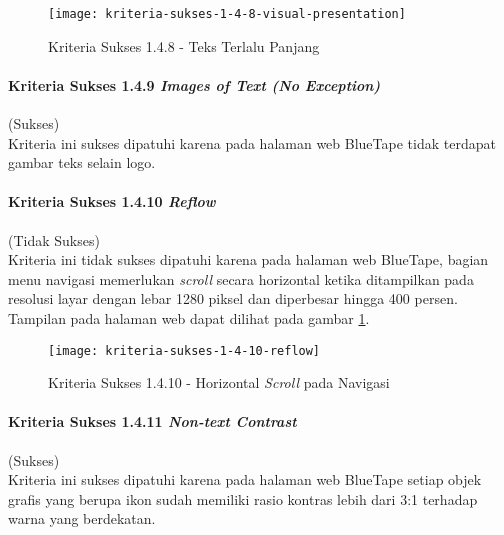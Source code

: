 \begin{figure}[H]
    \centering  
    \texttt{[image: kriteria-sukses-1-4-8-visual-presentation]}  
    \caption[Kriteria Sukses 1.4.8 - Teks Terlalu Panjang]{Kriteria Sukses 1.4.8 - Teks Terlalu Panjang}
    \label{fig:1.4.8_visual_presentation}  
\end{figure} 

\paragraph{Kriteria Sukses 1.4.9 \textit{Images of Text (No Exception)}}
\label{par:kepatuhan_bluetape_kriteria_sukses_1.4.9}
(Sukses)\\

Kriteria ini sukses dipatuhi karena pada halaman web BlueTape tidak terdapat gambar teks selain logo.

\paragraph{Kriteria Sukses 1.4.10 \textit{Reflow}}
\label{par:kepatuhan_bluetape_kriteria_sukses_1.4.10}
(Tidak Sukses)\\

Kriteria ini tidak sukses dipatuhi karena pada halaman web BlueTape, bagian menu navigasi memerlukan \textit{scroll} secara horizontal ketika ditampilkan pada resolusi layar dengan lebar 1280 piksel dan diperbesar hingga 400 persen. Tampilan pada halaman web dapat dilihat pada gambar \ref{fig:1.4.8_visual_presentation}.

\begin{figure}[H]
    \centering  
    \texttt{[image: kriteria-sukses-1-4-10-reflow]}  
    \caption[Kriteria Sukses 1.4.10 - Horizontal \textit{Scroll} pada Navigasi]{Kriteria Sukses 1.4.10 - Horizontal \textit{Scroll} pada Navigasi}
    \label{fig:1.4.10_reflow}  
\end{figure} 

\paragraph{Kriteria Sukses 1.4.11 \textit{Non-text Contrast}}
\label{par:kepatuhan_bluetape_kriteria_sukses_1.4.11}
(Sukses)\\

Kriteria ini sukses dipatuhi karena pada halaman web BlueTape setiap objek grafis yang berupa ikon sudah memiliki rasio kontras lebih dari 3:1 terhadap warna yang berdekatan.

